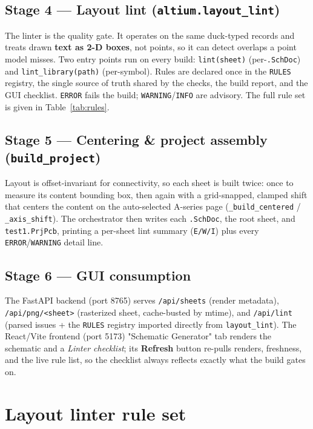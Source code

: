 \documentclass[11pt]{article}
\newcommand{\file}[1]{\texttt{#1}}
\newcommand{\mod}[1]{\texttt{#1}}
\begin{document}
\subsection{Stage 4 --- Layout lint (\mod{altium.layout\_lint})}\label{sec:lint}
The linter is the quality gate. It operates on the same duck-typed records and
treats drawn \textbf{text as 2-D boxes}, not points, so it can detect overlaps a
point model misses. Two entry points run on every build:
\mod{lint(sheet)} (per-\file{.SchDoc}) and \mod{lint\_library(path)}
(per-symbol). Rules are declared once in the \texttt{RULES} registry, the single
source of truth shared by the checks, the build report, and the GUI checklist.
\texttt{ERROR} fails the build; \texttt{WARNING}/\texttt{INFO} are advisory.
The full rule set is given in Table~\ref{tab:rules}.

\subsection{Stage 5 --- Centering \& project assembly (\mod{build\_project})}
Layout is offset-invariant for connectivity, so each sheet is built twice: once
to measure its content bounding box, then again with a grid-snapped, clamped
shift that centers the content on the auto-selected A-series page
(\mod{\_build\_centered} / \mod{\_axis\_shift}). The orchestrator then writes
each \file{.SchDoc}, the root sheet, and \file{test1.PrjPcb}, printing a
per-sheet lint summary (\texttt{E/W/I}) plus every \texttt{ERROR}/\texttt{WARNING}
detail line.

\subsection{Stage 6 --- GUI consumption}
The FastAPI backend (port 8765) serves \file{/api/sheets} (render metadata),
\file{/api/png/<sheet>} (rasterized sheet, cache-busted by mtime), and
\file{/api/lint} (parsed issues + the \texttt{RULES} registry imported directly
from \mod{layout\_lint}). The React/Vite frontend (port 5173) "Schematic
Generator" tab renders the schematic and a \emph{Linter checklist}; its
\textbf{Refresh} button re-pulls renders, freshness, and the live rule list, so
the checklist always reflects exactly what the build gates on.

\section{Layout linter rule set}\label{sec:gen-rules}
\end{document}

